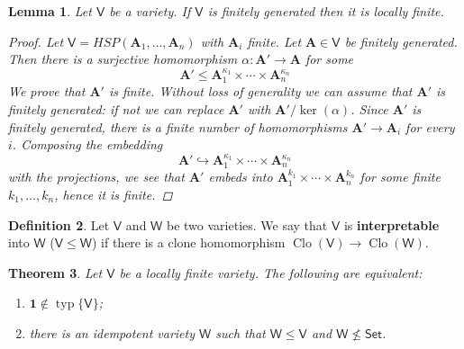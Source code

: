 \documentclass{amsart}
\theoremstyle{plain}
\newtheorem{theorem}{Theorem}[section]
\newtheorem{lemma}[theorem]{Lemma}
\theoremstyle{definition}
\newtheorem{definition}[theorem]{Definition}
\theoremstyle{remark}
\DeclareMathOperator{\Clo}{Clo}
\DeclareMathOperator{\typ}{typ}
\begin{document}
\begin{lemma}
    \label{loc_fin}
    Let $\mathsf{V}$ be a variety. 
    If $\mathsf{V}$ is finitely generated then it is locally finite. 
    \begin{proof}
        Let $\mathsf{V}=HSP(\mathbf{A}_1, \ldots, \mathbf{A}_n)$ with $\mathbf{A}_i$ finite. 
        Let $\mathbf{A} \in \mathsf{V}$ be finitely generated. 
        Then there is a surjective homomorphism $\alpha: \mathbf{A}' \to \mathbf{A}$ for some 
        \begin{equation*}
            \mathbf{A}' \le \mathbf{A}^{\kappa_1}_1 \times \cdots \times \mathbf{A}^{\kappa_n}_n
        \end{equation*} 
        We prove that $\mathbf{A}'$ is finite. 
        Without loss of generality we can assume that $\mathbf{A}'$ is finitely generated: if not we can replace $\mathbf{A}'$ with $\mathbf{A}' /\ker(\alpha)$. 
        Since $\mathbf{A}'$ is finitely generated, 
        there is a finite number of homomorphisms $\mathbf{A}' \to \mathbf{A}_i$ for every $i$. 
        Composing the embedding 
        \begin{equation*}
            \mathbf{A}' \hookrightarrow  \mathbf{A}^{\kappa_1}_1 \times \cdots \times \mathbf{A}^{\kappa_n}_n
        \end{equation*} with the projections, 
        we see that $\mathbf{A}'$ embeds into $\mathbf{A}^{k_1}_1 \times \cdots \times \mathbf{A}^{k_n}_n$ for some \emph{finite} $k_1, \ldots, k_n$, hence it is finite. 
    \end{proof}
\end{lemma}

\begin{definition}
    Let $\mathsf{V}$ and $\mathsf{W}$ be two varieties. 
    We say that $\mathsf{V}$ is \textbf{interpretable} into $\mathsf{W}$ ($\mathsf{V} \le \mathsf{W}$) if there is a clone homomorphism $\Clo(\mathsf{V}) \to \Clo(\mathsf{W})$. 
\end{definition}

\begin{theorem}
    \label{omitting_typ1}
    Let $\mathsf{V}$ be a locally finite variety. 
    The following are equivalent: 
    \begin{enumerate}
        \item $\mathbf{1} \notin \typ\{\mathsf{V}\}$; 
        \item there is an idempotent variety $\mathsf{W}$ such that $\mathsf{W} \le \mathsf{V}$ and $\mathsf{W} \nleq \mathsf{Set}$. 
    \end{enumerate}
\end{theorem}
\end{document}
